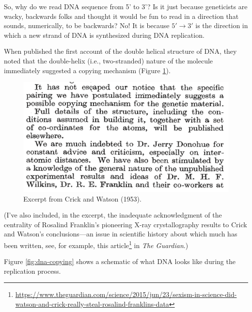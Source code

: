 \documentclass[]{krantz}
\renewcommand{\href}[2]{#2\footnote{\url{#1}}}
\begin{document}
So, why do we read DNA sequence from 5' to 3'? Is it just because geneticists are wacky, backwards
folks and thought it would be fun to read in a direction that sounds, numerically, to be
backwards? No! It is because \(5'\longrightarrow 3'\) is the direction in
which a new strand of DNA is
synthesized during DNA replication.

When \citet{watsonMolecularStructureNucleic1953} published the first account of the double helical structure of DNA,
they noted that the double-helix (i.e., two-stranded) nature of the molecule immediately suggested
a copying mechanism (Figure \ref{fig:crickwat}).

\begin{figure}

{\centering \includegraphics{figs/crick-and-watson} 

}

\caption{Excerpt from Crick and Watson (1953).}\label{fig:crickwat}
\end{figure}

(I've also included, in the excerpt, the inadequate acknowledgment
of the centrality of Rosalind Franklin's pioneering
X-ray crystallography results to Crick and Watson's conclusions---an issue in scientific history about
which much has been written, see, for example, this \href{https://www.theguardian.com/science/2015/jun/23/sexism-in-science-did-watson-and-crick-really-steal-rosalind-franklins-data}{article} in \emph{The Guardian}.)

Figure \ref{fig:dna-copying} shows a schematic of what DNA looks like during the replication process.
\end{document}
